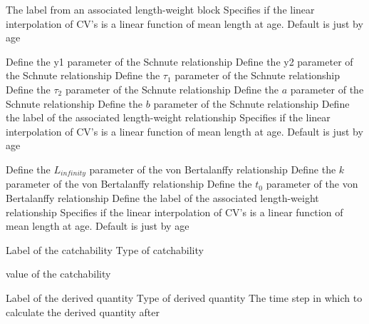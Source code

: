  {The label from an associated length-weight block}
 {Specifies if the linear interpolation of CV's is a linear function of mean length at age. Default is just by age}
\par\textbf{}\par
\par\textbf{}\par
{} {Define the y1 parameter of the Schnute relationship}
 {Define the y2 parameter of the Schnute relationship}
 {Define the $\tau_1$ parameter of the Schnute relationship}
 {Define the $\tau_2$ parameter of the Schnute relationship}
 {Define the $a$ parameter of the Schnute relationship}
 {Define the $b$ parameter of the Schnute relationship}
 {Define the label of the associated length-weight relationship}
 {Specifies if the linear interpolation of CV's is a linear function of mean length at age. Default is just by age}
\par\textbf{}\par
{} {Define the $L_{infinity}$ parameter of the von Bertalanffy relationship}
 {Define the $k$ parameter of the von Bertalanffy relationship}
 {Define the $t_0$ parameter of the von Bertalanffy relationship}
 {Define the label of the associated length-weight relationship}
 {Specifies if the linear interpolation of CV's is a linear function of mean length at age. Default is just by age}
\par\par
{} {Label of the catchability}
 {Type of catchability}
\par\textbf{}\par
{} {value of the catchability}
\par\textbf{}\par
{}\par\par
{} {Label of the derived quantity}
 {Type of derived quantity}
 {The time step in which to calculate the derived quantity after}
